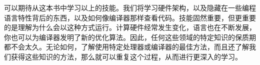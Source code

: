可以期待从这本书中学习以上的技能。我们将学习硬件架构，以及隐藏在一些编程语言特性背后的东西，以及如何像编译器那样查看代码。技能固然重要，但更重要的是理解为什么会以这种方式运行。计算硬件经常发生变化，语言也在不断发展，你也可以为编译器发明了新的优化算法。因此，任何这些领域的特定知识的保质期都不会太久。无论如何，了解使用特定处理器或编译器的最佳方法，而且还了解我们获得这些知识的方法，那么就可以重复这个过程，从而进行更深入的学习。
































